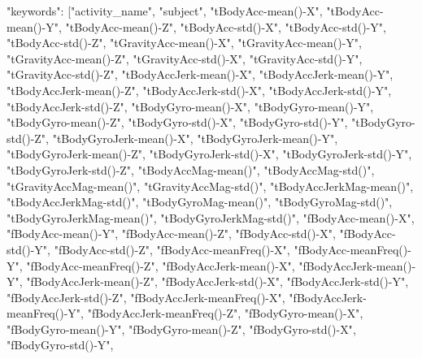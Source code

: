 \documentclass[
]{article}
\newenvironment{Shaded}{\begin{snugshade}}{\end{snugshade}}
\newcommand{\DataTypeTok}[1]{\textcolor[rgb]{0.13,0.29,0.53}{#1}}
\newcommand{\FunctionTok}[1]{\textcolor[rgb]{0.00,0.00,0.00}{#1}}
\newcommand{\OtherTok}[1]{\textcolor[rgb]{0.56,0.35,0.01}{#1}}
\newcommand{\StringTok}[1]{\textcolor[rgb]{0.31,0.60,0.02}{#1}}
\begin{document}
\begin{Shaded}
\begin{Highlighting}[]
  \DataTypeTok{"keywords"}\FunctionTok{:} \OtherTok{[}\StringTok{"activity\_name"}\OtherTok{,} \StringTok{"subject"}\OtherTok{,} \StringTok{"tBodyAcc{-}mean(){-}X"}\OtherTok{,} \StringTok{"tBodyAcc{-}mean(){-}Y"}\OtherTok{,} \StringTok{"tBodyAcc{-}mean(){-}Z"}\OtherTok{,} \StringTok{"tBodyAcc{-}std(){-}X"}\OtherTok{,} \StringTok{"tBodyAcc{-}std(){-}Y"}\OtherTok{,} \StringTok{"tBodyAcc{-}std(){-}Z"}\OtherTok{,} \StringTok{"tGravityAcc{-}mean(){-}X"}\OtherTok{,} \StringTok{"tGravityAcc{-}mean(){-}Y"}\OtherTok{,} \StringTok{"tGravityAcc{-}mean(){-}Z"}\OtherTok{,} \StringTok{"tGravityAcc{-}std(){-}X"}\OtherTok{,} \StringTok{"tGravityAcc{-}std(){-}Y"}\OtherTok{,} \StringTok{"tGravityAcc{-}std(){-}Z"}\OtherTok{,} \StringTok{"tBodyAccJerk{-}mean(){-}X"}\OtherTok{,} \StringTok{"tBodyAccJerk{-}mean(){-}Y"}\OtherTok{,} \StringTok{"tBodyAccJerk{-}mean(){-}Z"}\OtherTok{,} \StringTok{"tBodyAccJerk{-}std(){-}X"}\OtherTok{,} \StringTok{"tBodyAccJerk{-}std(){-}Y"}\OtherTok{,} \StringTok{"tBodyAccJerk{-}std(){-}Z"}\OtherTok{,} \StringTok{"tBodyGyro{-}mean(){-}X"}\OtherTok{,} \StringTok{"tBodyGyro{-}mean(){-}Y"}\OtherTok{,} \StringTok{"tBodyGyro{-}mean(){-}Z"}\OtherTok{,} \StringTok{"tBodyGyro{-}std(){-}X"}\OtherTok{,} \StringTok{"tBodyGyro{-}std(){-}Y"}\OtherTok{,} \StringTok{"tBodyGyro{-}std(){-}Z"}\OtherTok{,} \StringTok{"tBodyGyroJerk{-}mean(){-}X"}\OtherTok{,} \StringTok{"tBodyGyroJerk{-}mean(){-}Y"}\OtherTok{,} \StringTok{"tBodyGyroJerk{-}mean(){-}Z"}\OtherTok{,} \StringTok{"tBodyGyroJerk{-}std(){-}X"}\OtherTok{,} \StringTok{"tBodyGyroJerk{-}std(){-}Y"}\OtherTok{,} \StringTok{"tBodyGyroJerk{-}std(){-}Z"}\OtherTok{,} \StringTok{"tBodyAccMag{-}mean()"}\OtherTok{,} \StringTok{"tBodyAccMag{-}std()"}\OtherTok{,} \StringTok{"tGravityAccMag{-}mean()"}\OtherTok{,} \StringTok{"tGravityAccMag{-}std()"}\OtherTok{,} \StringTok{"tBodyAccJerkMag{-}mean()"}\OtherTok{,} \StringTok{"tBodyAccJerkMag{-}std()"}\OtherTok{,} \StringTok{"tBodyGyroMag{-}mean()"}\OtherTok{,} \StringTok{"tBodyGyroMag{-}std()"}\OtherTok{,} \StringTok{"tBodyGyroJerkMag{-}mean()"}\OtherTok{,} \StringTok{"tBodyGyroJerkMag{-}std()"}\OtherTok{,} \StringTok{"fBodyAcc{-}mean(){-}X"}\OtherTok{,} \StringTok{"fBodyAcc{-}mean(){-}Y"}\OtherTok{,} \StringTok{"fBodyAcc{-}mean(){-}Z"}\OtherTok{,} \StringTok{"fBodyAcc{-}std(){-}X"}\OtherTok{,} \StringTok{"fBodyAcc{-}std(){-}Y"}\OtherTok{,} \StringTok{"fBodyAcc{-}std(){-}Z"}\OtherTok{,} \StringTok{"fBodyAcc{-}meanFreq(){-}X"}\OtherTok{,} \StringTok{"fBodyAcc{-}meanFreq(){-}Y"}\OtherTok{,} \StringTok{"fBodyAcc{-}meanFreq(){-}Z"}\OtherTok{,} \StringTok{"fBodyAccJerk{-}mean(){-}X"}\OtherTok{,} \StringTok{"fBodyAccJerk{-}mean(){-}Y"}\OtherTok{,} \StringTok{"fBodyAccJerk{-}mean(){-}Z"}\OtherTok{,} \StringTok{"fBodyAccJerk{-}std(){-}X"}\OtherTok{,} \StringTok{"fBodyAccJerk{-}std(){-}Y"}\OtherTok{,} \StringTok{"fBodyAccJerk{-}std(){-}Z"}\OtherTok{,} \StringTok{"fBodyAccJerk{-}meanFreq(){-}X"}\OtherTok{,} \StringTok{"fBodyAccJerk{-}meanFreq(){-}Y"}\OtherTok{,} \StringTok{"fBodyAccJerk{-}meanFreq(){-}Z"}\OtherTok{,} \StringTok{"fBodyGyro{-}mean(){-}X"}\OtherTok{,} \StringTok{"fBodyGyro{-}mean(){-}Y"}\OtherTok{,} \StringTok{"fBodyGyro{-}mean(){-}Z"}\OtherTok{,} \StringTok{"fBodyGyro{-}std(){-}X"}\OtherTok{,} \StringTok{"fBodyGyro{-}std(){-}Y"}\OtherTok{,} 
\end{Highlighting}
\end{Shaded}
\end{document}
